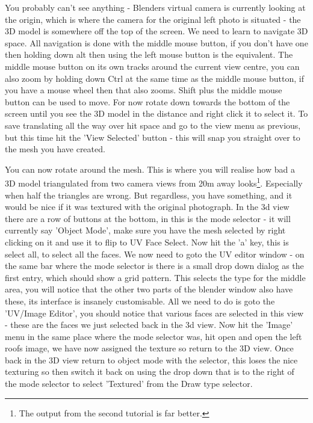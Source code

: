 \documentclass[10pt,a4paper,twoside]{article}
\begin{document}
You probably can't see anything - Blenders virtual camera is currently looking at the origin, which is where the camera for the original left photo is situated - the 3D model is somewhere off the top of the screen. We need to learn to navigate 3D space. All navigation is done with the middle mouse button, if you don't have one then holding down alt then using the left mouse button is the equivalent. The middle mouse button on its own tracks around the current view centre, you can also zoom by holding down Ctrl at the same time as the middle mouse button, if you have a mouse wheel then that also zooms. Shift plus the middle mouse button can be used to move. For now rotate down towards the bottom of the screen until you see the 3D model in the distance and right click it to select it. To save translating all the way over hit space and go to the view menu as previous, but this time hit the 'View Selected' button - this will snap you straight over to the mesh you have created.

You can now rotate around the mesh. This is where you will realise how bad a 3D model triangulated from two camera views from 20m away looks\footnote{The output from the second tutorial is far better.}. Especially when half the triangles are wrong. But regardless, you have something, and it would be nice if it was textured with the original photograph. In the 3d view there are a row of buttons at the bottom, in this is the mode selector - it will currently say 'Object Mode', make sure you have the mesh selected by right clicking on it and use it to flip to UV Face Select. Now hit the 'a' key, this is select all, to select all the faces. We now need to goto the UV editor window - on the same bar where the mode selector is there is a small drop down dialog as the first entry, which should show a grid pattern. This selects the type for the middle area, you will notice that the other two parts of the blender window also have these, its interface is insanely customisable. All we need to do is goto the 'UV/Image Editor', you should notice that various faces are selected in this view - these are the faces we just selected back in the 3d view. Now hit the 'Image' menu in the same place where the mode selector was, hit open and open the left roofs image, we have now assigned the texture so return to the 3D view. Once back in the 3D view return to object mode with the selector, this loses the nice texturing so then switch it back on using the drop down that is to the right of the mode selector to select 'Textured' from the Draw type selector.
\end{document}
